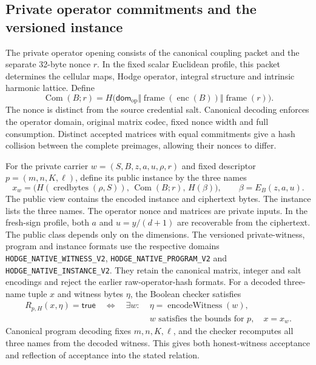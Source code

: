 \subsection{Private operator commitments and the versioned instance}
\label{sec:private-operator-instance}

The private operator opening consists of the canonical coupling packet and
the separate 32-byte nonce \(r\). In the fixed scalar Euclidean profile,
this packet determines the cellular maps, Hodge operator, integral structure
and intrinsic harmonic lattice. Define
\[
 \operatorname{Com}(B;r)=
 H\bigl(\mathsf{dom}_{\mathrm{op}}\Vert
   \operatorname{frame}(\operatorname{enc}(B))\Vert
   \operatorname{frame}(r)\bigr).
\]
The nonce is distinct from the source credential salt. Canonical decoding
enforces the operator domain, original matrix codec, fixed nonce width and
full consumption. Distinct accepted matrices with equal commitments give
a hash collision between the complete preimages, allowing their
nonces to differ.

For the private carrier \(w=(S,B,z,a,u,\rho,r)\) and fixed descriptor
\(p=(m,n,K,\ell)\), define its public instance by the three names
\begin{equation}
 x_w=\bigl(H(\operatorname{credbytes}(\rho,S)),\,
          \operatorname{Com}(B;r),\,H(\beta)\bigr),
 \qquad \beta=E_B(z,a,u).
 \label{eq:coupled-committed-instance}
\end{equation}
The public view contains the encoded instance and ciphertext bytes. The
instance lists the three names. The operator nonce and matrices are private
inputs. In the fresh-sign profile, both \(a\) and \(u=y/(d+1)\) are recoverable
from the ciphertext. The public class depends only on the dimensions.
The versioned private-witness,
program and instance formats use the respective domains
\texttt{HODGE\_NATIVE\_WITNESS\_V2},
\texttt{HODGE\_NATIVE\_PROGRAM\_V2} and
\texttt{HODGE\_NATIVE\_INSTANCE\_V2}. They retain the canonical matrix,
integer and salt encodings and reject the earlier raw-operator-hash formats.
For a decoded three-name tuple \(x\) and witness bytes \(\eta\), the Boolean
checker satisfies
\[
\begin{aligned}
 R_{p,H}(x,\eta)=\mathsf{true}
 \quad\Longleftrightarrow\quad \exists w:\;&
 \eta=\operatorname{encodeWitness}(w),\\
 &w\text{ satisfies the bounds for }p,\quad x=x_w.
\end{aligned}
\]
Canonical program decoding fixes \(m,n,K,\ell\), and the checker recomputes
all three names from the decoded witness. This gives both honest-witness
acceptance and reflection of acceptance into the stated relation.

